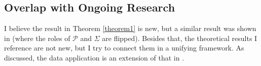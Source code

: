 \documentclass{article} %
\begin{document}
\subsection{Overlap with Ongoing Research}
I believe the result in Theorem \ref{theorem1} is new, but a similar result was shown in \cite{kim2022universal} (where the roles of $\mathcal{P}$ and $\Sigma$ are flipped). Besides that, the theoretical results I reference are not new, but I try to connect them in a unifying framework. As discussed, the data application is an extension of that in \cite{kim2022universal}. 
\end{document}

